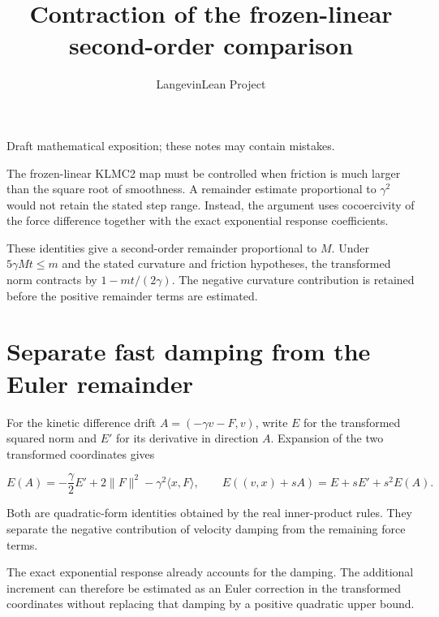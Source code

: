 \documentclass[11pt,a4paper]{article}
\title{\texorpdfstring{Contraction of the frozen-linear second-order comparison}{Contraction of the frozen-linear second-order comparison}}
\author{LangevinLean Project}
\date{}
\begin{document}
\maketitle
Draft mathematical exposition; these notes may contain mistakes.


The frozen-linear KLMC2 map must be controlled when friction is much larger than the square root of smoothness. A remainder estimate proportional to \(\gamma^2\) would not retain the stated step range. Instead, the argument uses cocoercivity of the force difference together with the exact exponential response coefficients.



These identities give a second-order remainder proportional to \(M\). Under \(5\gamma Mt\le m\) and the stated curvature and friction hypotheses, the transformed norm contracts by \(1-mt/(2\gamma)\). The negative curvature contribution is retained before the positive remainder terms are estimated.


\section{\texorpdfstring{Separate fast damping from the Euler remainder}{Separate fast damping from the Euler remainder}}


For the kinetic difference drift \(A=(-\gamma v-F,v)\), write \(E\) for the transformed squared norm and \(E'\) for its derivative in direction \(A\). Expansion of the two transformed coordinates gives

\[E(A)=-\frac\gamma2E'+2\|F\|^2-\gamma^2\langle x,F\rangle,\qquad E((v,x)+sA)=E+sE'+s^2E(A).\]

Both are quadratic-form identities obtained by the real inner-product rules. They separate the negative contribution of velocity damping from the remaining force terms.



The exact exponential response already accounts for the damping. The additional increment can therefore be estimated as an Euler correction in the transformed coordinates without replacing that damping by a positive quadratic upper bound.
\end{document}
